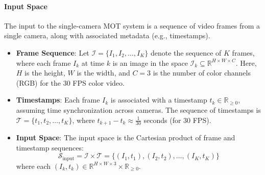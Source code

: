 \documentclass[12pt, a4paper]{article}
\begin{document}
\paragraph{Input Space}
The input to the single-camera MOT system is a sequence of video frames from a single camera, along with associated metadata (e.g., timestamps).
\begin{itemize}
    \item \textbf{Frame Sequence}: Let $\mathcal{I} = \{I_1, I_2, \ldots, I_K\}$ denote the sequence of $K$ frames, where each frame $I_k$ at time $k$ is an image in the space $\mathcal{I}_k \subseteq \mathbb{R}^{H \times W \times C}$. Here, $H$ is the height, $W$ is the width, and $C=3$ is the number of color channels (RGB) for the 30 FPS color video.
    \item \textbf{Timestamps}: Each frame $I_k$ is associated with a timestamp $t_k \in \mathbb{R}_{\geq 0}$, assuming time synchronization across cameras. The sequence of timestamps is $\mathcal{T} = \{t_1, t_2, \ldots, t_K\}$, where $t_{k+1} - t_k \approx \frac{1}{30}$ seconds (for 30 FPS).
    \item \textbf{Input Space}: The input space is the Cartesian product of frame and timestamp sequences:
    \[
    \mathcal{S}_{\text{input}} = \mathcal{I} \times \mathcal{T} = \{ (I_1, t_1), (I_2, t_2), \ldots, (I_K, t_K) \}
    \]
    where each $(I_k, t_k) \in \mathbb{R}^{H \times W \times 3} \times \mathbb{R}_{\geq 0}$.
\end{itemize}
\end{document}
